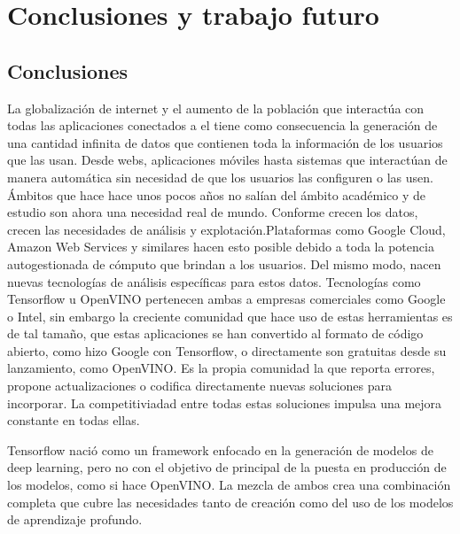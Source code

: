 \cleardoublepage
\mbox{}

\chapter{Conclusiones y trabajo futuro}
\label{ch:chapte6}

\section{Conclusiones}\label{sec:conclusiones}
La globalización de internet y el aumento de la población que interactúa con todas las aplicaciones conectados a el tiene como consecuencia
la generación de una cantidad infinita de datos que contienen toda la información de los usuarios que las usan.
Desde webs, aplicaciones móviles hasta sistemas que interactúan de manera automática sin necesidad de que los usuarios las configuren o las usen.
Ámbitos que hace hace unos pocos años no salían del ámbito académico y de estudio son ahora una necesidad real de mundo.
Conforme crecen los datos, crecen las necesidades de análisis y explotación.Plataformas como Google Cloud, Amazon Web Services y similares hacen esto posible
debido a toda la potencia autogestionada de cómputo que brindan a los usuarios.
Del mismo modo, nacen nuevas tecnologías de análisis específicas para estos datos.
Tecnologías como Tensorflow u OpenVINO pertenecen ambas a empresas comerciales como Google o Intel, sin embargo la creciente comunidad que hace uso de estas
herramientas es de tal tamaño, que estas aplicaciones se han convertido al formato de código abierto, como hizo Google con Tensorflow, o directamente son gratuitas desde su lanzamiento, como OpenVINO.
Es la propia comunidad la que reporta errores, propone actualizaciones o codifica directamente nuevas soluciones para incorporar.
La competitiviadad entre todas estas soluciones impulsa una mejora constante en todas ellas.

Tensorflow nació como un framework enfocado en la generación de modelos de deep learning, pero no con el objetivo de principal de la puesta en producción de los modelos, como si hace OpenVINO.
La mezcla de ambos crea una combinación completa que cubre las necesidades tanto de creación como del uso de los modelos de aprendizaje profundo.



